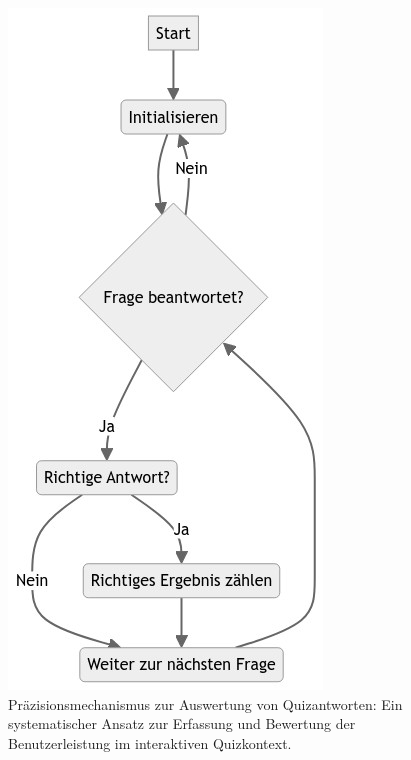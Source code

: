\documentclass[10pt, fleqn]{scrartcl}
\begin{document}
\begin{figure}[h!]
	\centering
	\includegraphics[scale=0.4]{flowcharts/flowchart2.png}
	\caption{Präzisionsmechanismus zur Auswertung von Quizantworten: Ein systematischer Ansatz zur Erfassung und Bewertung der Benutzerleistung im interaktiven Quizkontext.}
	\label{fig:counting-mechanism}
\end{figure}
\end{document}
